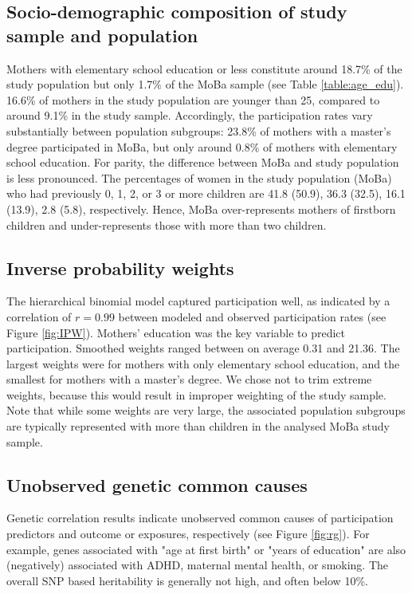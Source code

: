 \documentclass[12pt]{article}
\begin{document}
\subsection*{Socio-demographic composition of study sample and population}
 Mothers with elementary school education or less constitute around 18.7\% of the study population but only 1.7\% of the MoBa sample (see Table \ref{table:age_edu}). 16.6\% of mothers in the study population are younger than 25, compared to around 9.1\% in the study sample. Accordingly, the participation rates vary substantially between population subgroups: 23.8\% of mothers with a master's degree participated in MoBa, but only around 0.8\% of mothers with elementary school education. For parity, the difference between MoBa and study population is less pronounced. The percentages of women in the study population (MoBa) who had previously 0, 1, 2, or 3 or more children are 41.8 (50.9), 36.3 (32.5), 16.1 (13.9), 2.8 (5.8), respectively. Hence, MoBa over-represents mothers of firstborn children and under-represents those with more than two children.

\subsection*{Inverse probability weights}
The hierarchical binomial model captured participation well, as indicated by a correlation of $r=0.99$ between modeled and observed participation rates (see Figure \ref{fig:IPW}). Mothers' education was the key variable to predict participation. Smoothed weights ranged between on average 0.31 and 21.36. The largest weights were for mothers with only elementary school education, and the smallest for mothers with a master's degree. We chose not to trim extreme weights, because this would result in improper weighting of the study sample. Note that while some weights are very large, the associated population subgroups are typically represented with more than children in the analysed MoBa study sample.

\subsection*{Unobserved genetic common causes}
Genetic correlation results indicate unobserved common causes of participation predictors and outcome or exposures, respectively (see Figure \ref{fig:rg}). For example, genes associated with "age at first birth" or "years of education" are also (negatively) associated with ADHD, maternal mental health, or smoking. The overall SNP based heritability is generally not high, and often below 10\%.
\end{document}

